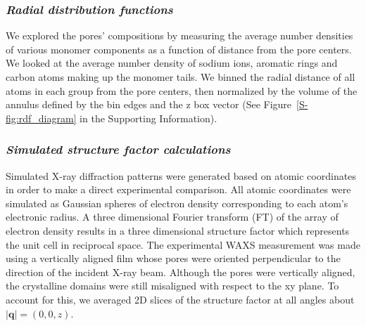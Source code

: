 \documentclass[journal=jpcbfk,manusciprt=article]{achemso}
\begin{document}


  \subsubsection{\textit{Radial distribution functions}}

  We explored the pores' compositions by measuring the average number densities
  of various monomer components as a function of distance from the pore centers.
  We looked at the average number density of sodium ions, aromatic rings and 
  carbon atoms making up the monomer tails. We binned the radial distance of all
  atoms in each group from the pore centers, then normalized by the volume of the
  annulus defined by the bin edges and the z box vector (See Figure~\ref{S-fig:rdf_diagram}
  in the Supporting Information). 

  \subsubsection{\textit{Simulated structure factor calculations}}

  Simulated X-ray diffraction patterns were generated based on atomic
  coordinates in order to make a direct experimental comparison. All atomic
  coordinates were simulated as Gaussian spheres of electron density
  corresponding to each atom's electronic radius. A three dimensional Fourier
  transform (FT) of the array of electron density results in a three dimensional
  structure factor which represents the unit cell in reciprocal space. The
  experimental WAXS measurement was made using a vertically aligned film whose 
  pores were oriented perpendicular to the direction of the incident X-ray beam. 
  Although the pores were vertically aligned, the crystalline domains were still
  misaligned with respect to the xy plane. To account for this, we averaged
  2D slices of the structure factor at all angles about $|\mathbf{q}| = (0, 0, z)$. 
\end{document}

